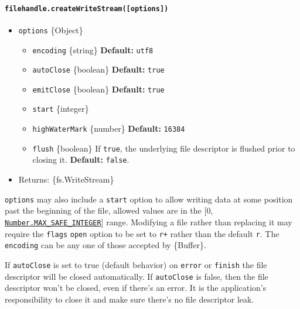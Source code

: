 \paragraph{\texorpdfstring{\texttt{filehandle.createWriteStream({[}options{]})}}{filehandle.createWriteStream({[}options{]})}}\label{filehandle.createwritestreamoptions}

\begin{itemize}
\tightlist
\item
  \texttt{options} \{Object\}

  \begin{itemize}
  \tightlist
  \item
    \texttt{encoding} \{string\} \textbf{Default:}
    \texttt{\textquotesingle{}utf8\textquotesingle{}}
  \item
    \texttt{autoClose} \{boolean\} \textbf{Default:} \texttt{true}
  \item
    \texttt{emitClose} \{boolean\} \textbf{Default:} \texttt{true}
  \item
    \texttt{start} \{integer\}
  \item
    \texttt{highWaterMark} \{number\} \textbf{Default:} \texttt{16384}
  \item
    \texttt{flush} \{boolean\} If \texttt{true}, the underlying file
    descriptor is flushed prior to closing it. \textbf{Default:}
    \texttt{false}.
  \end{itemize}
\item
  Returns: \{fs.WriteStream\}
\end{itemize}

\texttt{options} may also include a \texttt{start} option to allow
writing data at some position past the beginning of the file, allowed
values are in the {[}0,
\href{https://developer.mozilla.org/en-US/docs/Web/JavaScript/Reference/Global_Objects/Number/MAX_SAFE_INTEGER}{\texttt{Number.MAX\_SAFE\_INTEGER}}{]}
range. Modifying a file rather than replacing it may require the
\texttt{flags} \texttt{open} option to be set to \texttt{r+} rather than
the default \texttt{r}. The \texttt{encoding} can be any one of those
accepted by \{Buffer\}.

If \texttt{autoClose} is set to true (default behavior) on
\texttt{\textquotesingle{}error\textquotesingle{}} or
\texttt{\textquotesingle{}finish\textquotesingle{}} the file descriptor
will be closed automatically. If \texttt{autoClose} is false, then the
file descriptor won't be closed, even if there's an error. It is the
application's responsibility to close it and make sure there's no file
descriptor leak.

